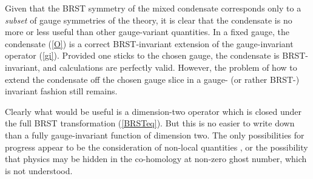\documentclass[a4paper,a4paper]{article}
\begin{document}
Given that the BRST symmetry of the mixed condensate corresponds only to a \emph{subset} of gauge symmetries of the theory, it is clear that the condensate is no more or less useful than other gauge-variant quantities. In a fixed gauge, the condensate (\ref{O}) is a correct BRST-invariant extension of the gauge-invariant operator (\ref{gi}).  Provided one sticks to the chosen gauge, the condensate is BRST-invariant, and calculations are perfectly valid. However, the problem of how to extend the condensate off the chosen gauge slice in a gauge- (or rather BRST-) invariant fashion still remains. 

Clearly what would be useful is a dimension-two operator which is closed under the full BRST transformation (\ref{BRSTeq}). But this is no easier to write down than a fully gauge-invariant function of dimension two. The only possibilities for progress appear to be the consideration of non-local quantities \cite{Gubarev:2000eu}, or the possibility that physics may be hidden in the co-homology at non-zero ghost number, which is not understood.
\end{document}
